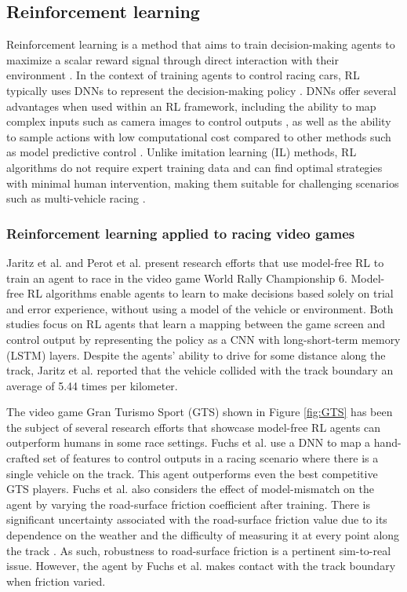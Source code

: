 \subsection{Reinforcement learning}
\label{sec:reinforcement_learning}
Reinforcement learning is a method that aims to train decision-making agents to maximize a scalar reward signal through direct interaction with their environment \cite{Plaat_2022}. 
In the context of training agents to control racing cars, RL typically uses DNNs to represent the decision-making policy \cite{Betz2021}. 
DNNs offer several advantages when used within an RL framework, including the ability to map complex inputs such as camera images to control outputs \cite{hsu2022, Schwarting2021, Jaritz2018, Perot2017}, as well as the ability to sample actions with low computational cost compared to other methods such as model predictive control \cite{Ghignone2022}. 
Unlike imitation learning (IL) methods, RL algorithms do not require expert training data and can find optimal strategies with minimal human intervention, making them suitable for challenging scenarios such as multi-vehicle racing \cite{Song2021, Wurman2022}. 


\subsubsection*{Reinforcement learning applied to racing video games}

Jaritz et al. \cite{Jaritz2018} and Perot et al. \cite{Perot2017} present research efforts that use model-free RL to train an agent to race in the video game World Rally Championship $6$. 
Model-free RL algorithms enable agents to learn to make decisions based solely on trial and error experience, without using a model of the vehicle or environment.
Both studies focus on RL agents that learn a mapping between the game screen and control output by representing the policy as a CNN with long-short-term memory (LSTM) layers. 
Despite the agents' ability to drive for some distance along the track, Jaritz et al. \cite{Jaritz2018} reported that the vehicle collided with the track boundary an average of 5.44 times per kilometer.

The video game Gran Turismo Sport (GTS) shown in Figure \ref{fig:GTS} has been the subject of several research efforts that showcase model-free RL agents can outperform humans \cite{Song2021, Wurman2022, Fuchs2021} in some race settings.
Fuchs et al. \cite{Fuchs2021} use a DNN to map a hand-crafted set of features to control outputs in a racing scenario where there is a single vehicle on the track.
This agent outperforms even the best competitive GTS players.
Fuchs et al. \cite{Fuchs2021} also considers the effect of model-mismatch on the agent by varying the road-surface friction coefficient after training.
There is significant uncertainty associated with the road-surface friction value due to its dependence on the weather and the difficulty of measuring it at every point along the track \cite{Novikov2018}.
As such, robustness to road-surface friction is a pertinent sim-to-real issue.
However, the agent by Fuchs et al. \cite{Fuchs2021} makes contact with the track boundary when friction varied.

